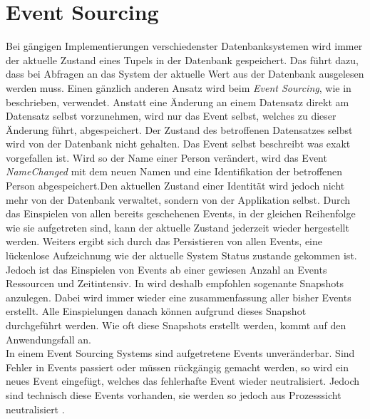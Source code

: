\section{Event Sourcing}
Bei gängigen Implementierungen verschiedenster Datenbanksystemen wird immer der aktuelle Zustand eines Tupels in der Datenbank gespeichert. Das führt dazu, dass bei Abfragen an das System der aktuelle Wert aus der Datenbank ausgelesen werden muss. Einen gänzlich anderen Ansatz wird beim \textit{Event Sourcing}, wie in \cite{vernon2013implementing} beschrieben, verwendet. Anstatt eine Änderung an einem Datensatz direkt am Datensatz selbst vorzunehmen, wird nur das Event selbst, welches zu dieser Änderung führt, abgespeichert. Der Zustand des betroffenen Datensatzes selbst wird von der Datenbank nicht gehalten. Das Event selbst beschreibt was exakt vorgefallen ist. Wird so der Name einer Person verändert, wird das Event \textit{NameChanged} mit dem neuen Namen und eine Identifikation der betroffenen Person abgespeichert.Den aktuellen Zustand einer Identität wird jedoch nicht mehr von der Datenbank verwaltet, sondern von der Applikation selbst. Durch das Einspielen von allen bereits geschehenen Events, in der gleichen Reihenfolge wie sie aufgetreten sind, kann der aktuelle Zustand jederzeit wieder hergestellt werden. Weiters ergibt sich durch das Persistieren von allen Events, eine lückenlose Aufzeichnung wie der aktuelle System Status zustande gekommen ist. \cite{vernon2013implementing} 
Jedoch ist das Einspielen von Events ab einer gewiesen Anzahl an Events Ressourcen und Zeitintensiv. In \cite{vernon2013implementing} wird deshalb empfohlen sogenante Snapshots anzulegen. Dabei wird immer wieder eine zusammenfassung aller bisher Events erstellt. Alle Einspielungen danach können aufgrund dieses Snapshot durchgeführt werden. Wie oft diese Snapshots erstellt werden, kommt auf den Anwendungsfall an. \\
In einem Event Sourcing Systems sind aufgetretene Events unveränderbar. Sind Fehler in Events passiert oder müssen rückgängig gemacht werden, so wird ein neues Event eingefügt, welches das fehlerhafte Event wieder neutralisiert. Jedoch sind technisch diese Events vorhanden, sie werden so jedoch aus Prozesssicht neutralisiert \citep{vernon2013implementing}. 

